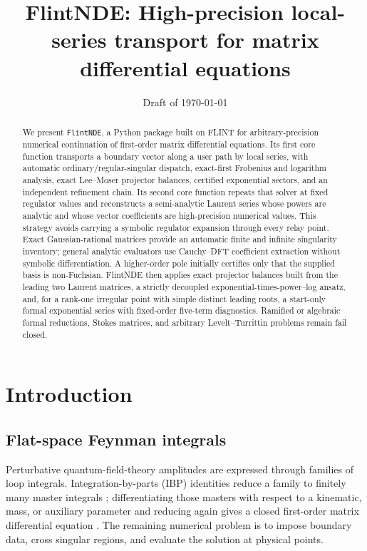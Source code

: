 \documentclass[11pt]{article}
\title{FlintNDE: High-precision local-series transport for matrix differential equations}
\date{Draft of \today}
\begin{document}
\maketitle

\begin{abstract}
We present \texttt{FlintNDE}, a Python package built on FLINT for arbitrary-precision
numerical continuation of first-order matrix differential equations.  Its first core
function transports a boundary vector along a user path by local series, with automatic
ordinary/regular-singular dispatch, exact-first Frobenius and logarithm analysis, exact
Lee--Moser projector balances, certified exponential sectors, and an independent refinement chain.  Its
second core function repeats that solver at fixed
regulator values and reconstructs a semi-analytic Laurent series whose powers are analytic
and whose vector coefficients are high-precision numerical values.  This strategy avoids
carrying a symbolic regulator expansion through every relay point.  Exact
Gaussian-rational matrices provide an automatic finite and infinite singularity inventory;
general analytic evaluators use Cauchy--DFT coefficient extraction without symbolic
differentiation.  A higher-order pole initially certifies only that the supplied basis is
non-Fuchsian.  FlintNDE then applies exact projector balances built from the leading two
Laurent matrices, a strictly decoupled exponential-times-power--log ansatz, and, for a
rank-one irregular point with simple distinct leading roots, a start-only formal exponential
series with fixed-order five-term diagnostics.  Ramified or algebraic formal reductions,
Stokes matrices, and arbitrary Levelt--Turrittin problems remain fail closed.
\end{abstract}

\section{Introduction}

\subsection{Flat-space Feynman integrals}

Perturbative quantum-field-theory amplitudes are expressed through families of loop
integrals.  Integration-by-parts (IBP) identities reduce a family to finitely many master
integrals \cite{Chetyrkin:1981qh}; differentiating those masters with respect to a
kinematic, mass, or auxiliary parameter and reducing again gives a closed first-order
matrix differential equation \cite{Gehrmann:1999as}.  The remaining numerical problem is
to impose boundary data, cross singular regions, and evaluate the solution at physical
points.
\end{document}
